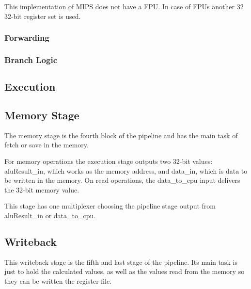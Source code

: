 This implementation of MIPS does not have a FPU. In case of FPUs another 32 32-bit register set is used.
\subsubsection{Forwarding}
\subsubsection{Branch Logic}


\subsection{Execution}
\subsection{Memory Stage}
The memory stage is the fourth block of the pipeline and has the main task of fetch or save in the memory. 

For memory operations the execution stage outputs two 32-bit values: aluResult\_in, which works as the memory address, and data\_in, which is data to be written in the memory. 
On read operations, the data\_to\_cpu input delivers the 32-bit memory value.

This stage has one multiplexer choosing the pipeline stage output from aluResult\_in or data\_to\_cpu.
\subsection{Writeback}
This writeback stage is the fifth and last stage of the pipeline. Its main task is just to hold the calculated values, as well as the values read from the memory 
so they can be written the register file.
